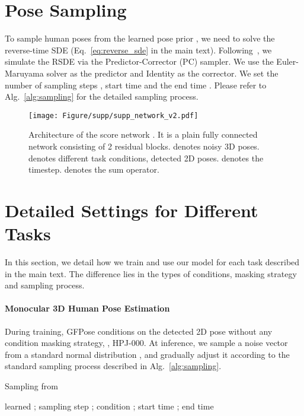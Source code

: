 \documentclass[10pt,twocolumn,letterpaper]{article}
\begin{document}
\section{Pose Sampling}
\label{sec:supp_sampling}
To sample human poses from the learned pose prior , we need to solve the reverse-time SDE (Eq.~\ref{eq:reverse_sde} in the main text). Following~\cite{song2020score}, we simulate the RSDE via the Predictor-Corrector (PC) sampler. We use the Euler-Maruyama solver as the predictor and Identity as the corrector. We set the number of sampling steps , start time  and the end time . Please refer to Alg.~\ref{alg:sampling} for the detailed sampling process.

\begin{figure*}[!t]
    \centering
    \texttt{[image: Figure/supp/supp\_network\_v2.pdf]}
\caption{Architecture of the score network . It is a plain fully connected network consisting of 2 residual blocks.   denotes noisy 3D poses.  denotes different task conditions, \eg detected 2D poses.  denotes the timestep.  denotes the sum operator.  }
    \label{fig:supp_network}
\end{figure*}

\section{Detailed Settings for Different Tasks}
\label{sec:supp_task}
In this section, we detail how we train and use our model for each task described in the main text. The difference lies in the types of conditions, masking strategy and sampling process. 




\paragraph{Monocular 3D Human Pose Estimation}
During training, GFPose conditions on the detected 2D pose without any condition masking strategy, \ie, HPJ-000. At inference, we sample a noise vector  from a standard normal distribution , and gradually adjust it according to the standard sampling process described in Alg.~\ref{alg:sampling}.

\begin{algorithm}[t]
\caption{Sampling from }
\label{alg:sampling}
\begin{algorithmic}[1]
\Require learned ; sampling step ; condition ; start time ; end time 
\State 
\State 
\State 
\State 
{}
    \State 
    \State 
    \State 
    \State 
\EndFor
\State \Return 
\end{algorithmic}
\end{algorithm}
\end{document}
